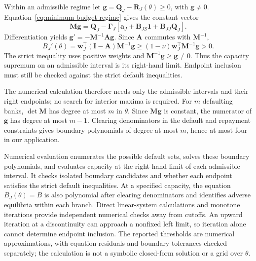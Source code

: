 Within an admissible regime let $\mathbf{g}=\mathbf{Q}_J-\mathbf{R}_J(\theta)\geq0$, with $\mathbf{g}\ne0$. Equation~\eqref{eq:minimum-budget-regime} gives the constant vector
\[
 \mathbf{M}\mathbf{g}
 =\mathbf{Q}_J-\boldsymbol{\Gamma}_J
    [\mathbf{a}_J+\mathbf{B}_{JS}\mathbf1+\mathbf{B}_{JJ}\mathbf{Q}_J].
\]
Differentiation yields $\mathbf{g}'=-\mathbf{M}^{-1}\mathbf{A}\mathbf{g}$. Since $\mathbf{A}$ commutes with $\mathbf{M}^{-1}$,
\[
 B_J'(\theta)
 =\mathbf{w}_J^\top(\mathbf{I}-\mathbf{A})\mathbf{M}^{-1}\mathbf{g}
 \geq(1-\nu)\mathbf{w}_J^\top\mathbf{M}^{-1}\mathbf{g}>0.
\]
The strict inequality uses positive weights and $\mathbf{M}^{-1}\mathbf{g}\geq\mathbf{g}\ne0$. Thus the capacity supremum on an admissible interval is its right-hand limit. Endpoint inclusion must still be checked against the strict default inequalities.

The numerical calculation therefore needs only the admissible intervals and their right endpoints; no search for interior maxima is required. For $m$ defaulting banks, $\det\mathbf{M}$ has degree at most $m$ in $\theta$. Since $\mathbf{M}\mathbf{g}$ is constant, the numerator of $\mathbf{g}$ has degree at most $m-1$. Clearing denominators in the default and repayment constraints gives boundary polynomials of degree at most $m$, hence at most four in our application.

Numerical evaluation enumerates the possible default sets, solves these boundary polynomials, and evaluates capacity at the right-hand limit of each admissible interval. It checks isolated boundary candidates and whether each endpoint satisfies the strict default inequalities. At a specified capacity, the equation $B_J(\theta)=B$ is also polynomial after clearing denominators and identifies adverse equilibria within each branch. Direct linear-system calculations and monotone iterations provide independent numerical checks away from cutoffs. An upward iteration at a discontinuity can approach a nonfixed left limit, so iteration alone cannot determine endpoint inclusion. The reported thresholds are numerical approximations, with equation residuals and boundary tolerances checked separately; the calculation is not a symbolic closed-form solution or a grid over $\theta$.

